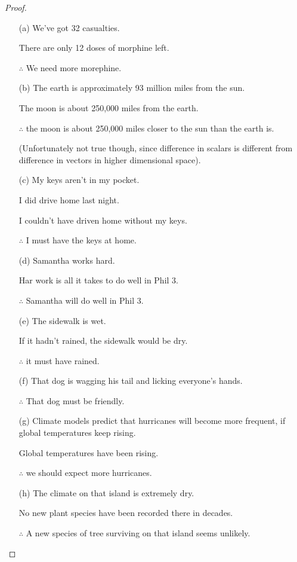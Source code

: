 \documentclass{article}
\begin{document}
\begin{proof}

    \hfil
    
    \begin{itemize}
        \item[(a)] We've got 32 casualties.
        
        There are only 12 doses of morphine left.

        $\therefore$ We need more morephine.
        \item[(b)] The earth is approximately 93 million miles from the sun.
        
        The moon is about 250,000 miles from the earth.

        $\therefore$ the moon is about 250,000 miles closer to the sun than the earth is.

        (Unfortunately not true though, since difference in scalars is different from difference in vectors in higher dimensional space).
        \item[(c)] My keys aren't in my pocket.
        
        I did drive home last night.

        I couldn't have driven home without my keys.

        $\therefore$ I must have the keys at home.
        \item[(d)] Samantha works hard.
        
        Har work is all it takes to do well in Phil 3.

        $\therefore$ Samantha will do well in Phil 3.
        \item[(e)] The sidewalk is wet.
        
        If it hadn't rained, the sidewalk would be dry.

        $\therefore$ it must have rained.
        \item[(f)] That dog is wagging his tail and licking everyone's hands.
        
        $\therefore$ That dog must be friendly.
        \item[(g)] Climate models predict that hurricanes will become more frequent, if global temperatures keep rising.
        
        Global temperatures have been rising.

        $\therefore$ we should expect more hurricanes.
        \item[(h)] The climate on that island is extremely dry.
        
        No new plant species have been recorded there in decades.

        $\therefore$ A new species of tree surviving on that island seems unlikely.
    \end{itemize}
\end{proof}
\end{document}
